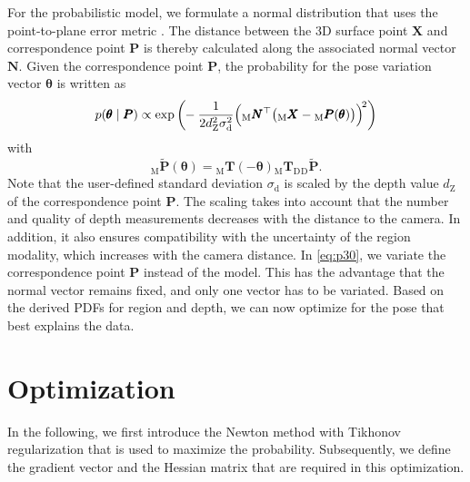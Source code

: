 \documentclass[10pt,twocolumn,letterpaper]{article}
\begin{document}
For the probabilistic model, we formulate a normal distribution that uses the point-to-plane error metric \cite{Chen1992}.
The distance between the 3D surface point $\pmb{X}$ and correspondence point $\pmb{P}$ is thereby calculated along the associated normal vector $\pmb{N}$.
Given the correspondence point $\pmb{P}$, the probability for the pose variation vector $\pmb{\theta}$ is written as
\begin{equation}\label{eq:p30}
	p(\pmb{\theta}\mid \pmb{P}) \propto \exp\bigg(\hspace{-0.1cm}-\frac{1}{2 d_\textrm{Z}^2 \sigma_\textrm{d}^2 }\Big({}_\textrm{M}\pmb{N}^\top\big({}_\textrm{M}\pmb{X} - {}_\textrm{M}\pmb{P}(\pmb{\theta})\big)\Big)^{\hspace{-0.05cm}2}\bigg)
\end{equation}
with
\begin{equation}\label{eq:p31}
	{}_\textrm{M}\pmb{\widetilde{P}}(\pmb{\theta}) = {}_\textrm{M}\pmb{T}(-\pmb{\theta}) {}_\textrm{M}\pmb{T}_\textrm{D} {}_\textrm{D}\pmb{\widetilde{P}}.
\end{equation}
Note that the user-defined standard deviation $\sigma_\textrm{d}$ is scaled by the depth value $d_\textrm{Z}$ of the correspondence point $\pmb{P}$.
The scaling takes into account that the number and quality of depth measurements decreases with the distance to the camera.
In addition, it also ensures compatibility with the uncertainty of the region modality, which increases with the camera distance.
In \cref{eq:p30}, we variate the correspondence point $\pmb{P}$ instead of the model.
This has the advantage that the normal vector remains fixed, and only one vector has to be variated.
Based on the derived \acp{PDF} for region and depth, we can now optimize for the pose that best explains the data.


 

\section{Optimization}\label{sec:o}
In the following, we first introduce the Newton method with Tikhonov regularization that is used to maximize the probability.
Subsequently, we define the gradient vector and the Hessian matrix that are required in this optimization.
\end{document}
